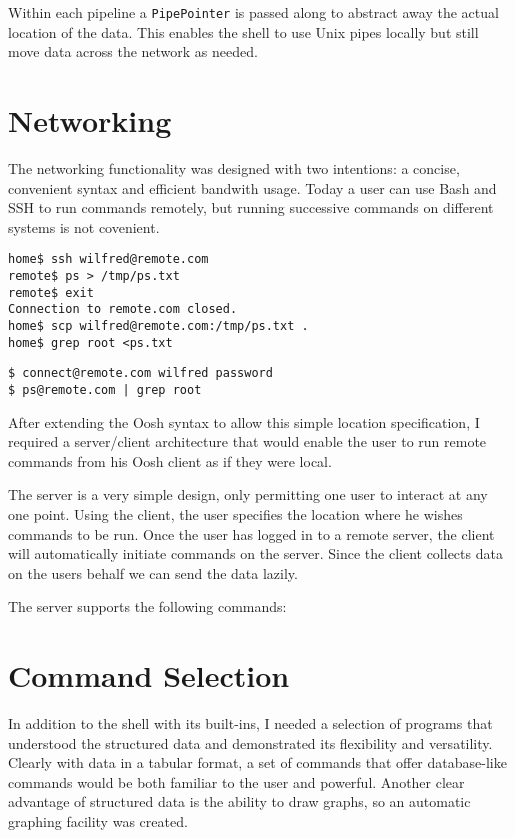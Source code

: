 \documentclass[12pt,twoside,notitlepage]{report}
\begin{document}
Within each pipeline %
a {\tt PipePointer} is passed along to abstract away the actual location of the
data. This enables the shell to use Unix pipes locally %
but still move data across the network as needed.

\section{Networking}

The networking functionality was designed with two intentions: a concise,
convenient syntax and efficient bandwith usage. Today a user can use Bash and
SSH to run commands remotely, but running successive commands on different
systems is not covenient.

\begin{verbatim}
home$ ssh wilfred@remote.com
remote$ ps > /tmp/ps.txt
remote$ exit
Connection to remote.com closed.
home$ scp wilfred@remote.com:/tmp/ps.txt .
home$ grep root <ps.txt 
\end{verbatim}

\begin{verbatim}
$ connect@remote.com wilfred password
$ ps@remote.com | grep root
\end{verbatim}

After extending the Oosh syntax %
to allow this simple location specification, I required a server/client
architecture that would enable the user to run remote commands from his Oosh
client as if they were local.

The server is a very simple design, only permitting one user to interact at any
one point. Using the client, the user specifies the location where he wishes
commands to be run. Once the user has logged in to a remote server, the client
will automatically initiate commands on the server. Since the client collects
data on the users behalf we can send the data lazily.

The server supports the following commands:

\section{Command Selection}
In addition to the shell with its built-ins, I needed a selection of programs
that understood the structured data and demonstrated its flexibility and
versatility. Clearly with data in a tabular format, a set of commands that offer
database-like commands would be both familiar to the user and powerful. Another
clear advantage of structured data is the ability to draw graphs, so an
automatic graphing facility was created.
\end{document}
